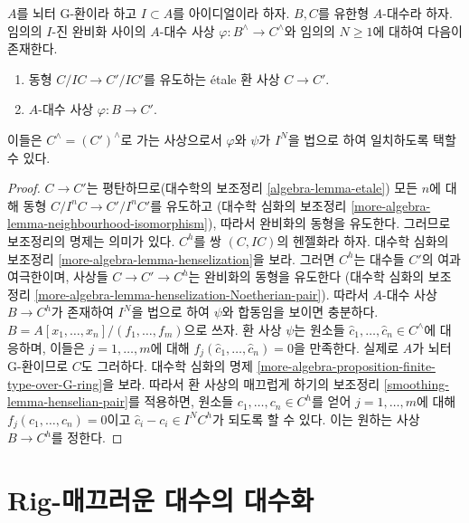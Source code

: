 \begin{lemma}
\label{lemma-fully-faithfulness}
$A$를 뇌터 G-환이라 하고 $I \subset A$를 아이디얼이라 하자.
$B, C$를 유한형 $A$-대수라 하자.
임의의 $I$-진 완비화 사이의 $A$-대수 사상
$\varphi : B^\wedge \to C^\wedge$와 임의의 $N \geq 1$에 대하여 다음이 존재한다.
\begin{enumerate}
\item 동형 $C/IC \to C'/IC'$를 유도하는 \'etale 환 사상 $C \to C'$.
\item $A$-대수 사상 $\varphi : B \to C'$.
\end{enumerate}
이들은 $C^\wedge = (C')^\wedge$로 가는 사상으로서
$\varphi$와 $\psi$가 $I^N$을 법으로 하여 일치하도록 택할 수 있다.
\end{lemma}

\begin{proof}
$C \to C'$는 평탄하므로(대수학의 보조정리 \ref{algebra-lemma-etale})
모든 $n$에 대해 동형 $C/I^nC \to C'/I^nC'$를 유도하고
(대수학 심화의 보조정리 \ref{more-algebra-lemma-neighbourhood-isomorphism}),
따라서 완비화의 동형을 유도한다. 그러므로 보조정리의 명제는 의미가 있다.
$C^h$를 쌍 $(C, IC)$의 헨젤화라 하자.
대수학 심화의 보조정리 \ref{more-algebra-lemma-henselization}을 보라.
그러면 $C^h$는 대수들 $C'$의 여과 여극한이며,
사상들 $C \to C' \to C^h$는 완비화의 동형을 유도한다
(대수학 심화의 보조정리 \ref{more-algebra-lemma-henselization-Noetherian-pair}).
따라서 $A$-대수 사상 $B \to C^h$가 존재하여
$I^N$을 법으로 하여 $\psi$와 합동임을 보이면 충분하다.
$B = A[x_1, \ldots, x_n]/(f_1, \ldots, f_m)$으로 쓰자.
환 사상 $\psi$는 원소들 $\hat c_1, \ldots, \hat c_n \in C^\wedge$에 대응하며,
이들은 $j = 1, \ldots, m$에 대해 $f_j(\hat c_1, \ldots, \hat c_n) = 0$을 만족한다.
실제로 $A$가 뇌터 G-환이므로 $C$도 그러하다.
대수학 심화의 명제 \ref{more-algebra-proposition-finite-type-over-G-ring}을 보라.
따라서 환 사상의 매끄럽게 하기의 보조정리 \ref{smoothing-lemma-henselian-pair}를 적용하면,
원소들 $c_1, \ldots, c_n \in C^h$를 얻어
$j = 1, \ldots, m$에 대해 $f_j(c_1, \ldots, c_n) = 0$이고
$\hat c_i - c_i \in I^NC^h$가 되도록 할 수 있다.
이는 원하는 사상 $B \to C^h$를 정한다.
\end{proof}


\section{Rig-매끄러운 대수의 대수화}
\label{section-algebraization-rig-smooth}


